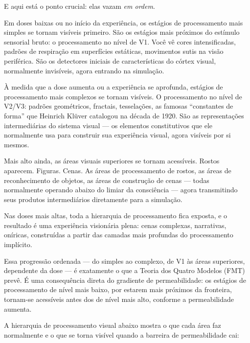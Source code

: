 \documentclass[11pt, twoside, openright]{book}
\begin{document}
E aqui está o ponto crucial: elas vazam \textit{em ordem}.

Em doses baixas ou no início da experiência, os estágios de processamento mais simples se tornam visíveis primeiro. São os estágios mais próximos do estímulo sensorial bruto: o processamento no nível de V1. Você vê cores intensificadas, padrões de respiração em superfícies estáticas, movimentos sutis na visão periférica. São os detectores iniciais de características do córtex visual, normalmente invisíveis, agora entrando na simulação.

À medida que a dose aumenta ou a experiência se aprofunda, estágios de processamento mais complexos se tornam visíveis. O processamento no nível de V2/\allowbreak{}V3: padrões geométricos, fractais, tesselações, as famosas ``constantes de forma'' que Heinrich Klüver catalogou na década de 1920. São as representações intermediárias do sistema visual --- os elementos constitutivos que ele normalmente usa para construir sua experiência visual, agora visíveis por si mesmos.

Mais alto ainda, as áreas visuais superiores se tornam acessíveis. Rostos aparecem. Figuras. Cenas. As áreas de processamento de rostos, as áreas de reconhecimento de objetos, as áreas de construção de cenas --- todas normalmente operando abaixo do limiar da consciência --- agora transmitindo seus produtos intermediários diretamente para a simulação.

Nas doses mais altas, toda a hierarquia de processamento fica exposta, e o resultado é uma experiência visionária plena: cenas complexas, narrativas, oníricas, construídas a partir das camadas mais profundas do processamento implícito.

Essa progressão ordenada --- do simples ao complexo, de V1 às áreas superiores, dependente da dose --- é exatamente o que a Teoria dos Quatro Modelos (FMT) prevê. É uma consequência direta do gradiente de permeabilidade: os estágios de processamento de nível mais baixo, por estarem mais próximos da fronteira, tornam-se acessíveis antes dos de nível mais alto, conforme a permeabilidade aumenta.

A hierarquia de processamento visual abaixo mostra o que cada área faz normalmente e o que se torna visível quando a barreira de permeabilidade cai:
\end{document}
